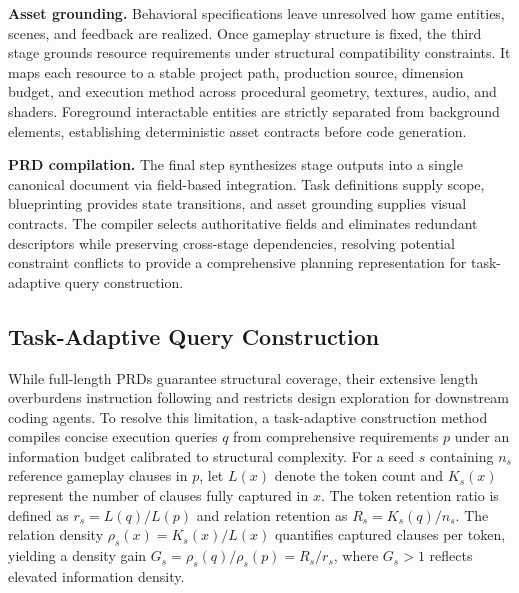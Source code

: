 \documentclass{article}
\begin{document}
\textbf{Asset grounding.}
Behavioral specifications leave unresolved how game entities, scenes, and feedback are realized. Once gameplay structure is fixed, the third stage grounds resource requirements under structural compatibility constraints. It maps each resource to a stable project path, production source, dimension budget, and execution method across procedural geometry, textures, audio, and shaders. Foreground interactable entities are strictly separated from background elements, establishing deterministic asset contracts before code generation.



\textbf{PRD compilation.}
The final step synthesizes stage outputs into a single canonical document via field-based integration. Task definitions supply scope, blueprinting provides state transitions, and asset grounding supplies visual contracts. The compiler selects authoritative fields and eliminates redundant descriptors while preserving cross-stage dependencies, resolving potential constraint conflicts to provide a comprehensive planning representation for task-adaptive query construction.


\subsection{Task-Adaptive Query Construction}
\label{sec:query_construction}

While full-length PRDs guarantee structural coverage, their extensive length overburdens instruction following and restricts design exploration for downstream coding agents. To resolve this limitation, a task-adaptive construction method compiles concise execution queries \(q\) from comprehensive requirements \(p\) under an information budget calibrated to structural complexity. For a seed \(s\) containing \(n_s\) reference gameplay clauses in \(p\), let \(L(x)\) denote the token count and \(K_s(x)\) represent the number of clauses fully captured in \(x\). The token retention ratio is defined as \(r_s = L(q)/L(p)\) and relation retention as \(R_s = K_s(q)/n_s\). The relation density \(\rho_s(x) = K_s(x)/L(x)\) quantifies captured clauses per token, yielding a density gain \(G_s = \rho_s(q)/\rho_s(p) = R_s/r_s\), where \(G_s > 1\) reflects elevated information density.
\end{document}
